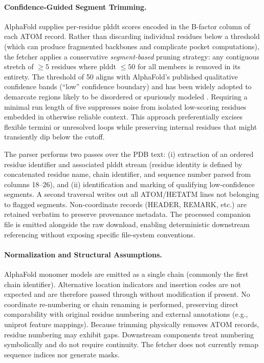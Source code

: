 \paragraph{Confidence-Guided Segment Trimming.} AlphaFold supplies per-residue \gls{plddt} scores encoded in the B-factor column of each ATOM record. Rather than discarding individual residues below a threshold (which can produce fragmented backbones and complicate pocket computations), the fetcher applies a conservative \emph{segment-based} pruning strategy: any contiguous stretch of $\ge 5$ residues where \gls{plddt} $\le 50$ for all members is removed in its entirety. The threshold of 50 aligns with AlphaFold's published qualitative confidence bands (``low'' confidence boundary) and has been widely adopted to demarcate regions likely to be disordered or spuriously modeled \cite{varadiAlphaFoldProteinStructure2022}. Requiring a minimal run length of five suppresses noise from isolated low-scoring residues embedded in otherwise reliable context. This approach preferentially excises flexible termini or unresolved loops while preserving internal residues that might transiently dip below the cutoff.

The parser performs two passes over the PDB text: (i) extraction of an ordered residue identifier and associated \gls{plddt} stream (residue identity is defined by concatenated residue name, chain identifier, and sequence number parsed from columns 18--26), and (ii) identification and marking of qualifying low-confidence segments. A second traversal writes out all ATOM/HETATM lines not belonging to flagged segments. Non-coordinate records (HEADER, REMARK, etc.) are retained verbatim to preserve provenance metadata. The processed companion file is emitted alongside the raw download, enabling deterministic downstream referencing without exposing specific file-system conventions.

\paragraph{Normalization and Structural Assumptions.} AlphaFold monomer models are emitted as a single chain (commonly the first chain identifier). Alternative location indicators and insertion codes are not expected and are therefore passed through without modification if present. No coordinate re-numbering or chain renaming is performed, preserving direct comparability with original residue numbering and external annotations (e.g., \gls{uniprot} feature mappings). Because trimming physically removes ATOM records, residue numbering may exhibit gaps. Downstream components treat numbering symbolically and do not require continuity. The fetcher does not currently remap sequence indices nor generate masks.

